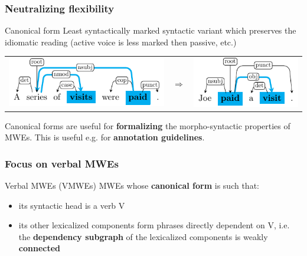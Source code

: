 \documentclass[xcolor=dvipsnames]{beamer}
\begin{document}
\begin{frame}
\begin{frame}
\end{frame}

\begin{frame} 
\frametitle{Neutralizing flexibility}

\begin{block}{Canonical form}
Least syntactically marked syntactic variant which preserves the idiomatic reading (active voice is less marked then passive, etc.)

\begin{tabular}{ccc}
\includegraphics[width=.45\textwidth]{Images/series-of-visits-paid} & 
$\Longrightarrow$ &
\includegraphics[width=.25\textwidth]{Images/pay-visit}
\end{tabular}

\end{block}

\begin{block}{}
Canonical forms are useful for \textbf{formalizing} the morpho-syntactic properties of MWEs. This is useful e.g. for \textbf{annotation guidelines}.
\end{block}

\end{frame}

\begin{frame} 
\frametitle{Focus on \textbf{verbal} MWEs}

\begin{scriptsize}

\begin{block}{Verbal MWEs (VMWEs)}
MWEs whose \textbf{canonical form} is such that:
    \begin{itemize}
    \item its syntactic head is a verb V 
    \item its other lexicalized components form phrases directly dependent on V, i.e. the \textbf{dependency subgraph} of the lexicalized components is weakly \textbf{connected}
    \end{itemize}


\end{block}
\end{scriptsize}
\end{frame}
\end{frame}
\end{document}
